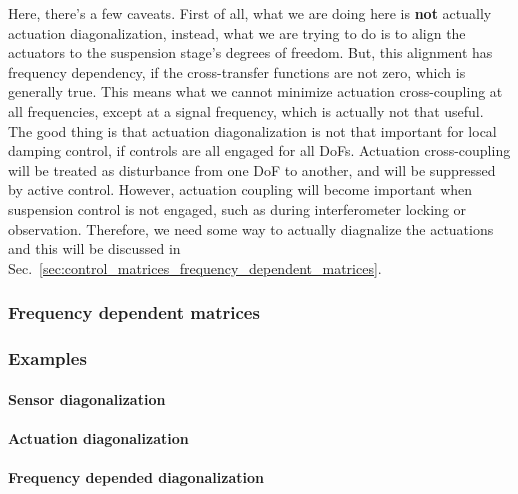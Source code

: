 Here, there's a few caveats.
First of all, what we are doing here is \textbf{not} actually actuation diagonalization, instead, what we are trying to do is to align the actuators to the suspension stage's degrees of freedom.
But, this alignment has frequency dependency, if the cross-transfer functions are not zero, which is generally true.
This means what we cannot minimize actuation cross-coupling at all frequencies, except at a signal frequency, which is actually not that useful.
The good thing is that actuation diagonalization is not that important for local damping control, if controls are all engaged for all DoFs.
Actuation cross-coupling will be treated as disturbance from one DoF to another, and will be suppressed by active control.
However, actuation coupling will become important when suspension control is not engaged, such as during interferometer locking or observation.
Therefore, we need some way to actually diagnalize the actuations and this will be discussed in Sec.~\ref{sec:control_matrices_frequency_dependent_matrices}.

\subsubsection{Frequency dependent matrices \label{sec:control_matrices_frequency_dependent_matrices}}
\subsubsection{Examples}
\paragraph{Sensor diagonalization}
\paragraph{Actuation diagonalization}
\paragraph{Frequency depended diagonalization}